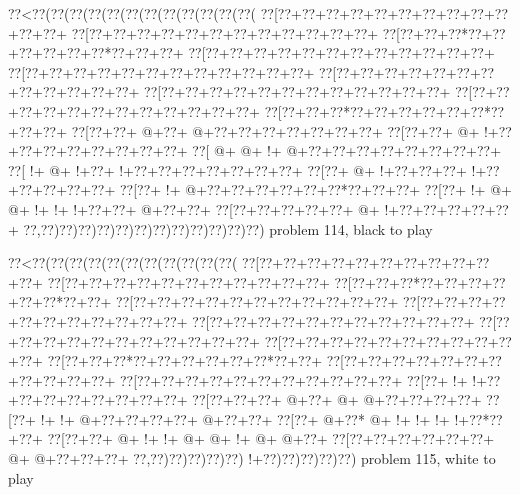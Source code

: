 \vbox{\vbox{\goo
\0??<\0??(\0??(\0??(\0??(\0??(\0??(\0??(\0??(\0??(\0??(\0??(\0??(
\0??[\0??+\0??+\0??+\0??+\0??+\0??+\0??+\0??+\0??+\0??+\0??+\0??+
\0??[\0??+\0??+\0??+\0??+\0??+\0??+\0??+\0??+\0??+\0??+\0??+\0??+
\0??[\0??+\0??+\0??*\0??+\0??+\0??+\0??+\0??+\0??*\0??+\0??+\0??+
\0??[\0??+\0??+\0??+\0??+\0??+\0??+\0??+\0??+\0??+\0??+\0??+\0??+
\0??[\0??+\0??+\0??+\0??+\0??+\0??+\0??+\0??+\0??+\0??+\0??+\0??+
\0??[\0??+\0??+\0??+\0??+\0??+\0??+\0??+\0??+\0??+\0??+\0??+\0??+
\0??[\0??+\0??+\0??+\0??+\0??+\0??+\0??+\0??+\0??+\0??+\0??+\0??+
\0??[\0??+\0??+\0??+\0??+\0??+\0??+\0??+\0??+\0??+\0??+\0??+\0??+
\0??[\0??+\0??+\0??*\0??+\0??+\0??+\0??+\0??+\0??*\0??+\0??+\0??+
\0??[\0??+\0??+\- @+\0??+\- @+\0??+\0??+\0??+\0??+\0??+\0??+\0??+
\0??[\0??+\0??+\- @+\- !+\0??+\0??+\0??+\0??+\0??+\0??+\0??+\0??+
\0??[\- @+\- @+\- !+\- @+\0??+\0??+\0??+\0??+\0??+\0??+\0??+\0??+
\0??[\- !+\- @+\- !+\0??+\- !+\0??+\0??+\0??+\0??+\0??+\0??+\0??+
\0??[\0??+\- @+\- !+\0??+\0??+\0??+\- !+\0??+\0??+\0??+\0??+\0??+
\0??[\0??+\- !+\- @+\0??+\0??+\0??+\0??+\0??+\0??*\0??+\0??+\0??+
\0??[\0??+\- !+\- @+\- @+\- !+\- !+\- !+\0??+\0??+\- @+\0??+\0??+
\0??[\0??+\0??+\0??+\0??+\0??+\- @+\- !+\0??+\0??+\0??+\0??+\0??+
\0??,\0??)\0??)\0??)\0??)\0??)\0??)\0??)\0??)\0??)\0??)\0??)\0??)
}
\hfil problem 114, black to play\hfil\break
}

\vbox{\vbox{\goo
\0??<\0??(\0??(\0??(\0??(\0??(\0??(\0??(\0??(\0??(\0??(\0??(
\0??[\0??+\0??+\0??+\0??+\0??+\0??+\0??+\0??+\0??+\0??+\0??+
\0??[\0??+\0??+\0??+\0??+\0??+\0??+\0??+\0??+\0??+\0??+\0??+
\0??[\0??+\0??+\0??*\0??+\0??+\0??+\0??+\0??+\0??*\0??+\0??+
\0??[\0??+\0??+\0??+\0??+\0??+\0??+\0??+\0??+\0??+\0??+\0??+
\0??[\0??+\0??+\0??+\0??+\0??+\0??+\0??+\0??+\0??+\0??+\0??+
\0??[\0??+\0??+\0??+\0??+\0??+\0??+\0??+\0??+\0??+\0??+\0??+
\0??[\0??+\0??+\0??+\0??+\0??+\0??+\0??+\0??+\0??+\0??+\0??+
\0??[\0??+\0??+\0??+\0??+\0??+\0??+\0??+\0??+\0??+\0??+\0??+
\0??[\0??+\0??+\0??*\0??+\0??+\0??+\0??+\0??+\0??*\0??+\0??+
\0??[\0??+\0??+\0??+\0??+\0??+\0??+\0??+\0??+\0??+\0??+\0??+
\0??[\0??+\0??+\0??+\0??+\0??+\0??+\0??+\0??+\0??+\0??+\0??+
\0??[\0??+\- !+\- !+\0??+\0??+\0??+\0??+\0??+\0??+\0??+\0??+
\0??[\0??+\0??+\0??+\- @+\0??+\- @+\- @+\0??+\0??+\0??+\0??+
\0??[\0??+\- !+\- !+\- @+\0??+\0??+\0??+\0??+\- @+\0??+\0??+
\0??[\0??+\- @+\0??*\- @+\- !+\- !+\- !+\- !+\0??*\0??+\0??+
\0??[\0??+\0??+\- @+\- !+\- !+\- @+\- @+\- !+\- @+\- @+\0??+
\0??[\0??+\0??+\0??+\0??+\0??+\0??+\- @+\- @+\0??+\0??+\0??+
\0??,\0??)\0??)\0??)\0??)\0??)\- !+\0??)\0??)\0??)\0??)\0??)
}
\hfil problem 115, white to play\hfil\break
}

